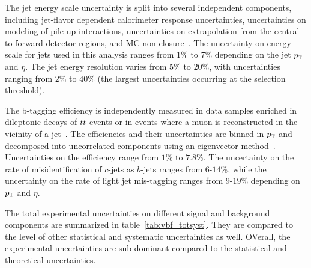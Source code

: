 The jet energy scale uncertainty is split into several independent components, including jet-flavor dependent calorimeter response uncertainties, uncertainties on modeling of pile-up interactions, uncertainties on extrapolation from the central to forward detector regions, and MC non-closure~\cite{atlas_jets}. The uncertainty on energy scale for jets used in this analysis ranges from $1\%$ to $7\%$ depending on the jet $p_{\textrm{\footnotesize\sc t}}$ and $\eta$. The jet energy resolution varies from $5\%$ to $20\%$, with uncertainties ranging from $2\%$ to $40\%$ (the largest uncertainties occurring at the selection threshold).

The b-tagging efficiency is independently measured in data samples enriched in dileptonic decays of $t\bar{t}$ events or in events where a muon is reconstructed in the vicinity of a jet~\cite{btag-calib,btag-muons}. The efficiencies and their uncertainties are binned in $p_{\textrm{\footnotesize\sc t}}$ and decomposed into uncorrelated components using an eigenvector method~\cite{ATLAS-CONF-2014-004}. Uncertainties on the efficiency range from $1\%$ to $7.8\%$. The uncertainty on the rate of misidentification of $c$-jets as $b$-jets ranges from $6$-$14$\%, while the uncertainty on the rate of light jet mis-tagging ranges from $9$-$19\%$ depending on $p_{\textrm{\footnotesize\sc t}}$ and $\eta$.

The total experimental uncertainties on different signal and background components are summarized in table~\ref{tab:vbf_totsyst}. They are compared to the level of other statistical and systematic uncertainties as well. OVerall, the experimental uncertainties are sub-dominant compared to the statistical and theoretical uncertainties.

